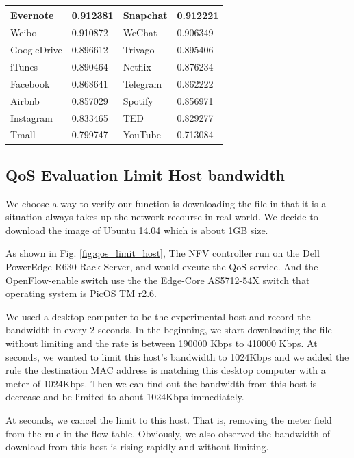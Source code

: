 \documentclass[journal]{IEEEtran}
\begin{document}
\begin{table}[!t]
\begin{tabular}{|l|l|l|l|}
Evernote            & 0.912381            & Snapchat          & 0.912221            \\ \hline
Weibo               & 0.910872            & WeChat            & 0.906349            \\ \hline
GoogleDrive         & 0.896612            & Trivago           & 0.895406             \\ \hline
iTunes              & 0.890464            & Netflix           & 0.876234             \\ \hline
Facebook            & 0.868641            & Telegram          & 0.862222             \\ \hline
Airbnb              & 0.857029            & Spotify           & 0.856971             \\ \hline
Instagram           & 0.833465            & TED               & 0.829277             \\ \hline
Tmall               & 0.799747            & YouTube           & 0.713084             \\ \hline
\end{tabular}
\end{table}

\subsection{QoS Evaluation Limit Host bandwidth}

We choose a way to verify our function is downloading the file in that it is a situation always takes up the network recourse in real world. We decide to download the image of Ubuntu 14.04 which is about 1GB size.

As shown in Fig. \ref{fig:qos_limit_host}, The NFV controller run on the Dell PowerEdge R630 Rack Server, and would excute the QoS service. And the OpenFlow-enable switch use the the Edge-Core AS5712-54X switch that operating system is PicOS TM r2.6.

We used a desktop computer to be the experimental host and record the bandwidth in every 2 seconds. In the beginning, we start downloading the file without limiting and the rate is between 190000 Kbps to 410000 Kbps.
At  seconds, we wanted to limit this host’s bandwidth to 1024Kbps and we added the rule the destination MAC address is matching this desktop computer with a meter of 1024Kbps. Then we can find out the bandwidth from this host is decrease and be limited to about 1024Kbps immediately.

At  seconds, we cancel the limit to this host. That is, removing the meter field from the rule in the flow table. Obviously, we also observed the bandwidth of download from this host is rising rapidly and without limiting.
\end{document}
